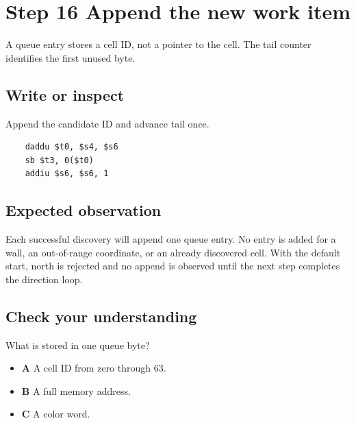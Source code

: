 \section{Step 16 Append the new work item}\label{maze-s16}

A queue entry stores a cell ID, not a pointer to the cell. The tail counter identifies the first unused byte.

\subsection{Write or inspect}

Append the candidate ID and advance tail once.

\begin{verbatim}
    daddu $t0, $s4, $s6
    sb $t3, 0($t0)
    addiu $s6, $s6, 1
\end{verbatim}

\subsection{Expected observation}

Each successful discovery will append one queue entry. No entry is added for a wall, an out-of-range coordinate, or an already discovered cell. With the default start, north is rejected and no append is observed until the next step completes the direction loop.

\subsection{Check your understanding}

What is stored in one queue byte?

\begin{itemize}
  \item \textbf{A} A cell ID from zero through 63.
  \item \textbf{B} A full memory address.
  \item \textbf{C} A color word.
\end{itemize}
